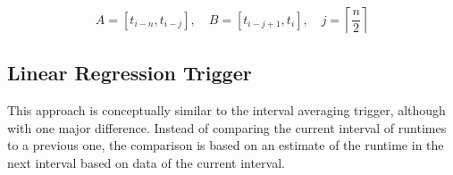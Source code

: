 \begin{equation}
	A = \left[t_{i-n}, t_{i-j}\right],\quad B=\left[t_{i-j+1},t_i\right],\quad j=\left\lceil\frac{n}{2}\right\rceil\label{eq:split_intervals}
\end{equation}

\subsection{Linear Regression Trigger}
This approach is conceptually similar to the interval averaging trigger, although with one major difference. Instead of comparing the current interval of runtimes to a previous one, the comparison is based on an estimate of the runtime in the next interval based on data of the current interval.




